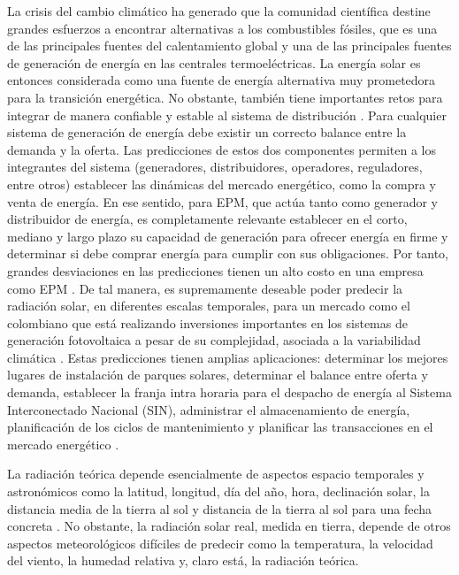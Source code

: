 \documentclass[a4paper]{article}
\begin{document}
La crisis del cambio climático ha generado que la comunidad científica destine grandes esfuerzos a encontrar alternativas a los combustibles fósiles, que es una de las principales fuentes del calentamiento global \cite{ref:thecausclch} y una de las principales fuentes de generación de energía en las centrales termoeléctricas. 
La energía solar es entonces considerada como una fuente de energía alternativa muy prometedora para la transición energética. No obstante, también tiene importantes retos para integrar de manera confiable y estable al sistema de distribución \cite{ref:photvfor}.
Para cualquier sistema de generación de energía debe existir un correcto balance entre la demanda y la oferta. Las predicciones de estos dos componentes permiten a los integrantes del sistema (generadores, distribuidores, operadores, reguladores, entre otros) establecer las dinámicas del mercado energético, como la compra y venta de energía. 
En ese sentido, para EPM, que actúa tanto como generador y distribuidor de energía, es completamente relevante establecer en el corto, mediano y largo plazo su capacidad de generación para ofrecer energía en firme y determinar si debe comprar energía para cumplir con sus obligaciones. Por tanto, grandes desviaciones en las predicciones tienen un alto costo en una empresa como EPM \cite{ref:shortforrad}.
De tal manera, es supremamente deseable poder predecir la radiación solar, en diferentes escalas temporales, para un mercado como el colombiano que está realizando inversiones importantes en los sistemas de generación fotovoltaica a pesar de su complejidad, asociada a la variabilidad climática \cite{ref:harvestredrist}. Estas predicciones tienen amplias aplicaciones: determinar los mejores lugares de instalación de parques solares, determinar el balance entre oferta y demanda, establecer la franja intra horaria para el despacho de energía al Sistema Interconectado Nacional (SIN), administrar el almacenamiento de energía, planificación de los ciclos de mantenimiento y planificar las transacciones en el mercado energético \cite{ref:shortforsol}\cite{ref:assenergy}.

La radiación teórica depende esencialmente de aspectos espacio temporales y astronómicos como la latitud, longitud, día del año, hora, declinación solar, la distancia media de la tierra al sol y distancia de la tierra al sol para una fecha concreta \cite{ref:calcradsol}. No obstante, la radiación solar real, medida en tierra, depende de otros aspectos meteorológicos difíciles de predecir como la temperatura, la velocidad del viento, la humedad relativa y, claro está, la radiación teórica.
\end{document}
